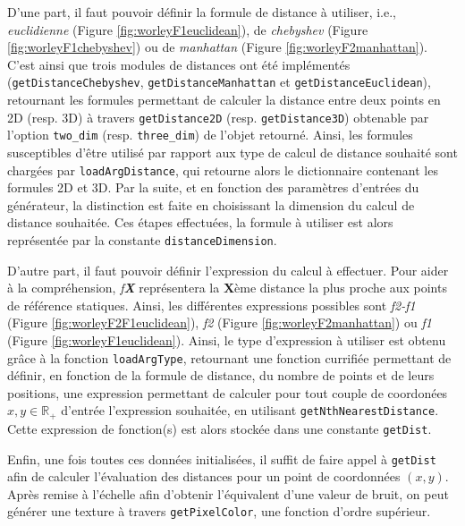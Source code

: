 \documentclass[11pt]{article}
\begin{document}
D'une part, il faut pouvoir définir la formule de distance à utiliser, i.e., \textit{euclidienne} (Figure \ref{fig:worleyF1euclidean}), de \textit{chebyshev} (Figure \ref{fig:worleyF1chebyshev}) ou de \textit{manhattan} (Figure \ref{fig:worleyF2manhattan}). C'est ainsi que trois modules de distances ont été implémentés (\texttt{getDistanceChebyshev}, \texttt{getDistanceManhattan} et \texttt{getDistanceEuclidean}), retournant les formules permettant de calculer la distance entre deux points en 2D (resp. 3D) à travers \texttt{getDistance2D} (resp. \texttt{getDistance3D}) obtenable par l'option \texttt{two\_dim} (resp. \texttt{three\_dim}) de l'objet retourné. Ainsi, les formules susceptibles d'être utilisé par rapport aux type de calcul de distance souhaité sont chargées par \texttt{loadArgDistance}, qui retourne alors le dictionnaire contenant les formules 2D et 3D. Par la suite, et en fonction des paramètres d'entrées du générateur, la distinction est faite en choisissant la dimension du calcul de distance souhaitée. Ces étapes effectuées, la formule à utiliser est alors représentée par la constante \texttt{distanceDimension}.

D'autre part, il faut pouvoir définir l'expression du calcul à effectuer. Pour aider à la compréhension, \textit{f\textbf{X}} représentera la \textbf{X}ème distance la plus proche aux points de référence statiques. Ainsi, les différentes expressions possibles sont \textit{f2-f1} (Figure \ref{fig:worleyF2F1euclidean}), \textit{f2} (Figure \ref{fig:worleyF2manhattan}) ou \textit{f1} (Figure \ref{fig:worleyF1euclidean}). Ainsi, le type d'expression à utiliser est obtenu grâce à la fonction \texttt{loadArgType}, retournant une fonction currifiée permettant de définir, en fonction de la formule de distance, du nombre de points et de leurs positions, une expression permettant de calculer pour tout couple de coordonées $x, y \in \mathbb{R}_{+}$ d'entrée l'expression souhaitée, en utilisant \texttt{getNthNearestDistance}. Cette expression de fonction(s) est alors stockée dans une constante \texttt{getDist}.

Enfin, une fois toutes ces données initialisées, il suffit de faire appel à \texttt{getDist} afin de calculer l'évaluation des distances pour un point de coordonnées $(x, y)$. Après remise à l'échelle afin d'obtenir l'équivalent d'une valeur de bruit, on peut générer une texture à travers \texttt{getPixelColor}, une fonction d'ordre supérieur.
\end{document}

